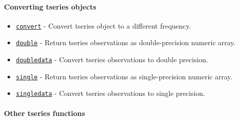 \paragraph{Converting tseries objects}\label{converting-tseries-objects}

\begin{itemize}
\itemsep1pt\parskip0pt
\item
  \href{tseries/convert}{\texttt{convert}} - Convert tseries object to a
  different frequency.
\item
  \href{tseries/double}{\texttt{double}} - Return tseries observations
  as double-precision numeric array.
\item
  \href{tseries/doubledata}{\texttt{doubledata}} - Convert tseries
  observations to double precision.
\item
  \href{tseries/single}{\texttt{single}} - Return tseries observations
  as single-precision numeric array.
\item
  \href{tseries/singledata}{\texttt{singledata}} - Convert tseries
  observations to single precision.
\end{itemize}

\paragraph{Other tseries functions}\label{other-tseries-functions}

